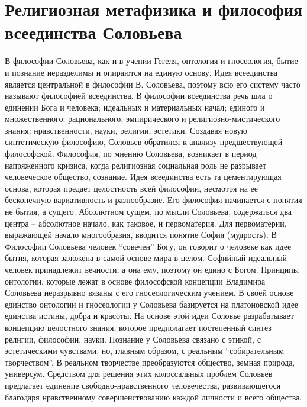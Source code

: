 \documentclass[12pt]{article}
\begin{document}
\section{Религиозная метафизика и философия всеединства Соловьева}
В философии Соловьева, как и в учении Гегеля, онтология и гносеология, бытие и познание неразделимы и
опираются на единую основу. 
Идея всеединства является центральной в философии В. Соловьева, поэтому всю его систему часто называют
философией всеединства.
В философии всеединства речь шла о единении Бога и человека; идеальных и материальных начал; единого и
множественного; рационального, эмпирического и религиозно-мистического знания; нравственности, науки,
религии, эстетики.
Создавая новую синтетическую философию, Соловьев обратился к анализу предшествующей философской.
Философия, по мнению Соловьева, возникает в период напряженного кризиса, когда религиозная социальная
роль не разрывает человеческое общество, сознание. Идея всеединства есть та цементирующая основа, которая
предает целостность всей философии, несмотря на ее бесконечную вариативность и разнообразие.
Его  философия  начинается  с  понятия  не  бытия,  а  сущего.  Абсолютном  сущем,  по  мысли  Соловьева,
содержаться два центра – абсолютное начало, как таковое, и первоматерия. Для первоматерии, выражающей
начало многообразия, вводится понятие София (мудрость). В Философии Соловьева человек “совечен” Богу, он
говорит о человеке как идее бытия, которая заложена в самой основе мира в целом. Софийный идеальный
человек принадлежит вечности, а она ему, поэтому он едино с Богом. 
Принципы  онтологии,  которые  лежат  в  основе  философской  концепции  Владимира  Соловьева  неразрывно
вязаны  с  его  гносеологическим  учением.  В  своей  основе  единство  онтологии  и  гносеологии  у  Соловьева
базируется  на  платоновской  идее  единства  истины,  добра  и  красоты.  На  основе  этой  идеи  Соловье
разрабатывает концепцию целостного знания, которое предполагает постепенный синтез религии, философии,
науки.
Познание  у  Соловьева  связано  с  этикой,  с  эстетическими  чувствами,  но,  главным  образом,  с  реальным
“собирательным творчеством”. В реальном творчестве преобразуются общество, земная природа, универсум.
Средством для решения этих колоссальных проблем Соловьев предлагает единение свободно-нравственного
человечества,  развивающегося  благодаря  нравственному  совершенствованию  каждой  личности  и  всего
общества.

\newpage
\end{document}
